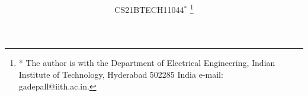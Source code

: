 \documentclass[journal,12pt,twocolumn]{IEEEtran}
\renewcommand\thesection{\arabic{section}}
\begin{document}
\makeatletter
{}
\makeatother
\let\StandardTheFigure\thefigure
\renewcommand{\thefigure}{\thesection}
\makeatletter
{}
\makeatother
\let\StandardTheFigure\thefigure
\let\StandardTheTable\thetable
\let\vec\mathbf
{}
\vspace{3cm}
\title{%
}
%
%
%
\author{ CS21BTECH11044$^{*}$%
\thanks{* The author is with the Department
of Electrical Engineering, Indian Institute of Technology, Hyderabad
502285 India e-mail:  gadepall@iith.ac.in.}%
}
% 
%
\end{document}
